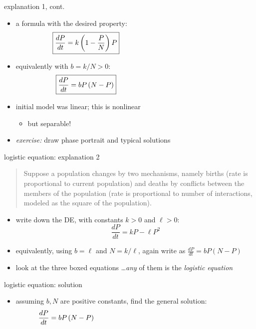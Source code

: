 \documentclass{beamer}
\begin{document}
\begin{frame}{explanation 1, cont.}

\begin{itemize}
\item a formula with the desired property:
    $$\boxed{\frac{dP}{dt} = k \left(1-\frac{P}{N}\right) P} \hspace{50mm}$$
\item equivalently with $b=k/N >0$:
    $$\boxed{\frac{dP}{dt} = b P \left(N-P\right)} \hspace{50mm}$$
\item initial model was linear; this is nonlinear
     \begin{itemize}
     \item but separable!
     \end{itemize}
\item \emph{exercise:} draw phase portrait and typical solutions
\end{itemize}
\end{frame}


\begin{frame}{logistic equation: explanation 2}

\begin{quotation}
\noindent Suppose a population changes by two mechanisms, namely births (rate is proportional to current population) and deaths by conflicts between the members of the population (rate is proportional to number of interactions, modeled as the square of the population).
\end{quotation}

\begin{itemize}
\item write down the DE, with constants $k>0$ and $\ell>0$:
    $$\boxed{\frac{dP}{dt} = k P - \ell P^2}$$
\item equivalently, using $b=\ell$ and $N=k/\ell$, again write as $\frac{dP}{dt} = b P \left(N-P\right)$
\item look at the three boxed equations \dots \emph{any} of them is the \emph{logistic equation}
\end{itemize}
\end{frame}


\begin{frame}{logistic equation: solution}

\begin{itemize}
\item assuming $b,N$ are positive constants, find the general solution:
    $$\frac{dP}{dt} = b P \left(N-P\right) \hspace{70mm}$$
\end{itemize}

\vspace{50mm}
\end{frame}
\end{document}
